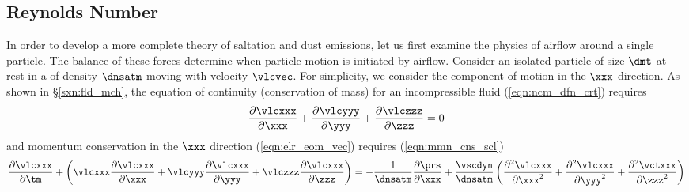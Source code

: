 \documentclass[12pt,twoside]{book}
\begin{document}
\subsection[Reynolds Number]{Reynolds Number}
In order to develop a more complete theory of saltation and dust
emissions, let us first examine the physics of airflow around a single 
particle. 
The balance of these forces determine when particle motion is
initiated by airflow.
Consider an isolated particle of size $\dmt$ at rest in a
 of density $\dnsatm$ moving with velocity
$\vlcvec$.  
For simplicity, we consider the component of motion in the $\xxx$
direction. 
As shown in \S\ref{sxn:fld_mch}, the equation of continuity  
(conservation of mass) for an incompressible fluid
(\ref{eqn:ncm_dfn_crt}) requires   
\begin{equation}
\frac{\partial \vlcxxx}{\partial \xxx} + 
\frac{\partial \vlcyyy}{\partial \yyy} + 
\frac{\partial \vlczzz}{\partial \zzz} = 0 
\label{eqn:ncm_crt}
\end{equation}
and momentum conservation in the $\xxx$ direction
(\ref{eqn:elr_eom_vec}) requires (\ref{eqn:mmn_cns_scl})
\begin{equation}
\frac{\partial \vlcxxx}{\partial \tm} + 
\left( 
\vlcxxx \frac{\partial \vlcxxx}{\partial \xxx} +
\vlcyyy \frac{\partial \vlcxxx}{\partial \yyy} +
\vlczzz \frac{\partial \vlcxxx}{\partial \zzz} 
\right) =  
-\frac{1}{\dnsatm} \frac{\partial \prs}{\partial \xxx} +
\frac{\vscdyn}{\dnsatm} 
\left( 
\frac{\partial^{2} \vlcxxx}{\partial \xxx^{2}} +
\frac{\partial^{2} \vlcxxx}{\partial \yyy^{2}} +
\frac{\partial^{2} \vctxxx}{\partial \zzz^{2}} 
\right) 
\label{eqn:mmn_cns_ryn}
\end{equation}
\end{document}
